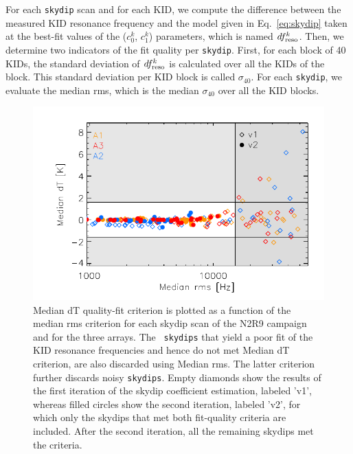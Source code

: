 For each {\tt skydip} scan and %
for each KID, 
we compute the difference between the measured KID resonance frequency and the model
given in Eq.~\ref{eq:skydip} taken at the best-fit values of the
($c_0^k$, $c_1^k$) parameters{\lp, which is named $df_{\rm{reso}}^k$.} Then, we
determine two indicators of the fit quality per {\tt skydip}. {\lp First,
for each block of 40 KIDs, the standard deviation of $df_{\rm{reso}}^k$ is calculated
over all the KIDs of the block. This standard deviation per KID block
is called $\sigma_{40}$. For each {\tt skydip}, we evaluate the
median rms, which is the median $\sigma_{40}$ over all the KID blocks.} 
%
\begin{figure}[!htbp]
\begin{center}
\includegraphics[clip=true,width=\linewidth]{Figures/plot_skydip_selection_two_crit.pdf}
\caption[N2R9 skydip scan selection.]{ Median dT quality-fit criterion
is plotted as a function of the median rms criterion for each skydip
scan of the N2R9 campaign and for the three arrays. {\lp The {\tt
skydips} that yield a poor fit of the KID resonance frequencies and hence
do not met Median dT criterion, are also discarded using
Median rms. The latter criterion further discards noisy {\tt skydips}.}
Empty diamonds show the results of the first
iteration of the skydip coefficient estimation, labeled 'v1', whereas
filled circles show the second iteration, labeled 'v2', for which only the skydips
that met both fit-quality criteria are included.
After the second iteration, all the remaining skydips met the criteria.}
\label{fig:skydipselection}
\end{center}
\end{figure}
